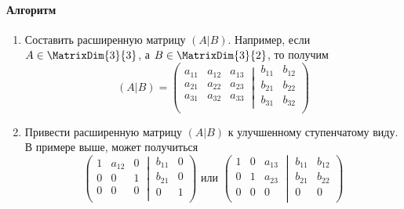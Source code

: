 \paragraph{Алгоритм}
\begin{enumerate}
\item Составить расширенную матрицу $(A|B)$.
Например, если $A\in \MatrixDim{3}{3}$, а $B\in \MatrixDim{3}{2}$, то получим
\[
(A|B) = 
\left(
\left.
\begin{matrix}
{a_{11}}&{a_{12}}&{a_{13}}\\
{a_{21}}&{a_{22}}&{a_{23}}\\
{a_{31}}&{a_{32}}&{a_{33}}\\
\end{matrix}
\:\right|\:
\begin{matrix}
{b_{11}}&{b_{12}}\\
{b_{21}}&{b_{22}}\\
{b_{31}}&{b_{32}}\\
\end{matrix}
\right)
\]

\item Привести расширенную матрицу $(A|B)$ к улучшенному ступенчатому виду.
В примере выше, может получиться
\[
\left(
\left.
\begin{matrix}
{1}&{a_{12}}&{0}\\
{0}&{0}&{1}\\
{0}&{0}&{0}\\
\end{matrix}
\:\right|\:
\begin{matrix}
{b_{11}}&{0}\\
{b_{21}}&{0}\\
{0}&{1}\\
\end{matrix}
\right)\text{ или }
\left(
\left.
\begin{matrix}
{1}&{0}&{a_{13}}\\
{0}&{1}&{a_{23}}\\
{0}&{0}&{0}\\
\end{matrix}
\:\right|\:
\begin{matrix}
{b_{11}}&{b_{12}}\\
{b_{21}}&{b_{22}}\\
{0}&{0}\\
\end{matrix}
\right)
\]



\end{enumerate}
